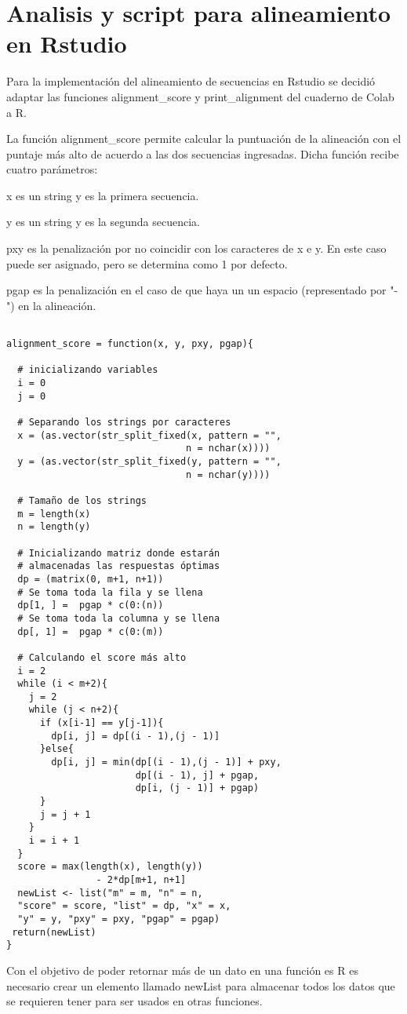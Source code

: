 \documentclass[usenatbib]{tjaa}
\begin{document}
\section{Analisis y script para alineamiento en Rstudio}
Para la implementación del alineamiento de secuencias en Rstudio se decidió adaptar las funciones alignment\_score y print\_alignment del cuaderno de Colab a R. 

La función alignment\_score permite calcular la puntuación de la alineación con el puntaje más alto de acuerdo a las dos secuencias ingresadas. Dicha función recibe cuatro parámetros:

x es un string y es la primera secuencia.

y es un string y es la segunda secuencia.

pxy es la penalización por no coincidir con los caracteres de x e y. En este caso puede ser asignado, pero se determina como 1 por defecto.

pgap es la penalización en el caso de que haya un un espacio (representado por "-") en la alineación.



\begin{verbatim}

alignment_score = function(x, y, pxy, pgap){

  # inicializando variables
  i = 0
  j = 0
  
  # Separando los strings por caracteres
  x = (as.vector(str_split_fixed(x, pattern = "",
                                n = nchar(x))))
  y = (as.vector(str_split_fixed(y, pattern = "",
                                n = nchar(y))))
  
  # Tamaño de los strings
  m = length(x)
  n = length(y)

  # Inicializando matriz donde estarán 
  # almacenadas las respuestas óptimas
  dp = (matrix(0, m+1, n+1))
  # Se toma toda la fila y se llena
  dp[1, ] =  pgap * c(0:(n))
  # Se toma toda la columna y se llena
  dp[, 1] =  pgap * c(0:(m)) 
  
  # Calculando el score más alto
  i = 2
  while (i < m+2){
    j = 2
    while (j < n+2){
      if (x[i-1] == y[j-1]){
        dp[i, j] = dp[(i - 1),(j - 1)]
      }else{
        dp[i, j] = min(dp[(i - 1),(j - 1)] + pxy,
                       dp[(i - 1), j] + pgap,
                       dp[i, (j - 1)] + pgap)
      }
      j = j + 1
    }
    i = i + 1
  }
  score = max(length(x), length(y))
                - 2*dp[m+1, n+1]
  newList <- list("m" = m, "n" = n, 
  "score" = score, "list" = dp, "x" = x, 
  "y" = y, "pxy" = pxy, "pgap" = pgap)
 return(newList)
}
\end{verbatim}
Con el objetivo de poder retornar más de un dato en una función es R es necesario crear un elemento llamado newList para almacenar todos los datos que se requieren tener para ser usados en otras funciones.
\end{document}
